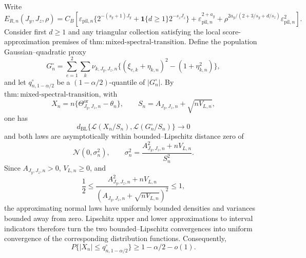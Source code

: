 Write
\[
E_{R,n}(J_y,J_z,\rho)=C_B\left[
\varepsilon_{\mathrm{pil},n}\{2^{-(s_y+1)J_y}+\mathbf 1\{d\ge1\}2^{-s_zJ_z}\}
+\varepsilon_{\mathrm{pil},n}^{2+a_y}
+\rho^{2a_y/(2+3/s_y+d/s_z)}\varepsilon_{\mathrm{pil},n}^{2}
\right].
\]
Consider first \(d\ge1\) and any triangular collection satisfying the local score-approximation premises of \(\mathrm{thm{:}mixed\text{-}spectral\text{-}transition}\).  Define the population Gaussian--quadratic proxy
\[
G_n^\circ=\sum_{e=1}^2\sum_k\nu_{k,J_y,J_z,n}
\{(\xi_{e,k}+\eta_{k,n})^2-(1+\eta_{k,n}^2)\},
\]
and let \(q_{n,1-\alpha/2}^\circ\) be a \((1-\alpha/2)\)-quantile of \(|G_n^\circ|\).  By \(\mathrm{thm{:}mixed\text{-}spectral\text{-}transition}\), with
\[
X_n=n\{\Theta^{\mathrm{or}}_{J_y,J_z,n}-\theta_n\},
\qquad
S_n=A_{J_y,J_z,n}+\sqrt{nV_{L,n}},
\]
one has
\[
d_{\mathrm{BL}}\{\mathcal L(X_n/S_n),\mathcal L(G_n^\circ/S_n)\}\longrightarrow0
\]
and both laws are asymptotically within bounded--Lipschitz distance zero of
\[
\mathcal N(0,\sigma_n^2),
\qquad
\sigma_n^2=\frac{A_{J_y,J_z,n}^2+nV_{L,n}}{S_n^2}.
\]
Since \(A_{J_y,J_z,n}>0\), \(V_{L,n}\ge0\), and
\[
\frac12\le
\frac{A_{J_y,J_z,n}^2+nV_{L,n}}
{(A_{J_y,J_z,n}+\sqrt{nV_{L,n}})^2}
\le1,
\]
the approximating normal laws have uniformly bounded densities and variances bounded away from zero.  Lipschitz upper and lower approximations to interval indicators therefore turn the two bounded--Lipschitz convergences into uniform convergence of the corresponding distribution functions.  Consequently,
\[
P\{|X_n|\le q_{n,1-\alpha/2}^\circ\}\ge1-\alpha/2-o(1).
\]


